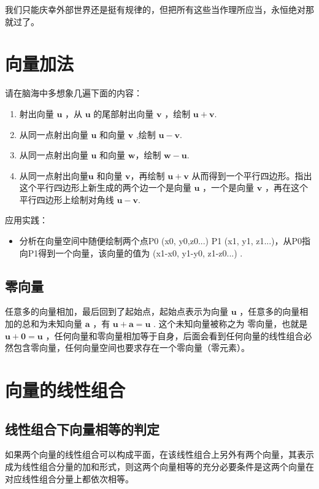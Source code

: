 \documentclass[12pt,oneside]{book}
\begin{document}
我们只能庆幸外部世界还是挺有规律的，但把所有这些当作理所应当，永恒绝对那就过了。



\section{向量加法}
请在脑海中多想象几遍下面的内容：

\begin{enumerate}
\item 射出向量 $\boldsymbol{u}$ ，从 $\boldsymbol{u}$ 的尾部射出向量  $\boldsymbol{v}$  ，绘制  $\boldsymbol{u} +\boldsymbol{v} $.
\item 从同一点射出向量 $\boldsymbol{u}$ 和向量 $\boldsymbol{v}$ ,绘制  $\boldsymbol{u} - \boldsymbol{v} $.
\item 从同一点射出向量 $\boldsymbol{u}$ 和向量 $\boldsymbol{w}$，绘制 $\boldsymbol{w} - \boldsymbol{u} $.
\item 从同一点射出向量$\boldsymbol{u}$ 和向量 $\boldsymbol{v}$，再绘制 $\boldsymbol{u} +\boldsymbol{v} $ 从而得到一个平行四边形。指出这个平行四边形上新生成的两个边一个是向量 $\boldsymbol{u}$ ，一个是向量 $\boldsymbol{v}$ ，再在这个平行四边形上绘制对角线 $\boldsymbol{u} -\boldsymbol{v} $.
\end{enumerate}

应用实践：
\begin{itemize}
\item 分析在向量空间中随便绘制两个点P0 (x0, y0,z0...) P1 (x1, y1, z1...)，从P0指向P1得到一个向量，该向量的值为 (x1-x0, y1-y0, z1-z0...) .
\end{itemize}

\subsection{零向量}
任意多的向量相加，最后回到了起始点，起始点表示为向量 $\boldsymbol{u}$ ，任意多的向量相加的总和为未知向量 $\boldsymbol{a}$ ，有 $\boldsymbol{u} + \boldsymbol{a} = \boldsymbol{u}$ . 这个未知向量被称之为 零向量，也就是  $\boldsymbol{u} + \boldsymbol{0} = \boldsymbol{u}$ ，任何向量和零向量相加等于自身，后面会看到任何向量的线性组合必然包含零向量，任何向量空间也要求存在一个零向量（零元素）。

\section{向量的线性组合}

\subsection{线性组合下向量相等的判定}
如果两个向量的线性组合可以构成平面，在该线性组合上另外有两个向量，其表示成为线性组合分量的加和形式，则这两个向量相等的充分必要条件是这两个向量在对应线性组合分量上都依次相等。
\end{document}
